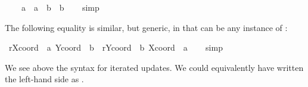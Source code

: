 \begin{isabellebody}
\ \ \ \ {}a\ {}\ a{}\ {}\ b\ {}\ b{}{}{}\isanewline
%
\isadelimproof
\ \ %
\endisadelimproof
%
\isatagproof
{}\isamarkupfalse%
\ simp%
\endisatagproof
{\isafoldproof}%
%
\isadelimproof
%
\endisadelimproof
%
\begin{isamarkuptext}%
The following equality is similar, but generic, in that 
  can be any instance of :%
\end{isamarkuptext}%
\isamarkuptrue%
\isamarkupfalse%
\ {}r{}Xcoord\ {}{}\ a{}\ Ycoord\ {}{}\ b{}\ {}\ r{}Ycoord\ {}{}\ b{}\ Xcoord\ {}{}\ a{}{}\isanewline
%
\isadelimproof
\ \ %
\endisadelimproof
%
\isatagproof
{}\isamarkupfalse%
\ simp%
\endisatagproof
{\isafoldproof}%
%
\isadelimproof
%
\endisadelimproof
%
\begin{isamarkuptext}%
\noindent
  We see above the syntax for iterated updates.  We could equivalently
  have written the left-hand side as .


\end{isamarkuptext}
\end{isabellebody}
